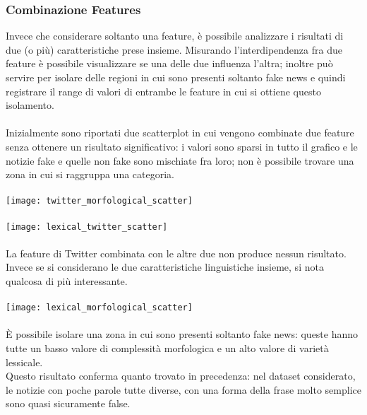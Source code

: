 \documentclass{article}
\begin{document}
\begin{multicols}{2}
				\subsubsection{Combinazione Features}
				Invece che considerare soltanto una feature, è possibile analizzare i risultati di due (o più) caratteristiche prese insieme. Misurando l'interdipendenza fra due feature è possibile visualizzare se una delle due influenza l'altra; inoltre può servire per isolare delle regioni in cui sono presenti soltanto fake news e quindi registrare il range di valori di entrambe le feature in cui si ottiene questo isolamento.\\~\\
				Inizialmente sono riportati due scatterplot in cui vengono combinate due feature senza ottenere un risultato significativo: i valori sono sparsi in tutto il grafico e le notizie fake e quelle non fake sono mischiate fra loro; non è possibile trovare una zona in cui si raggruppa una categoria.
				\\~\\						
				\texttt{[image: twitter\_morfological\_scatter]}
				\\~\\
				\texttt{[image: lexical\_twitter\_scatter]}
				\\~\\
				La feature di Twitter combinata con le altre due non produce nessun risultato.\\Invece se si considerano le due caratteristiche linguistiche insieme, si nota qualcosa di più interessante.
				\\~\\
				\texttt{[image: lexical\_morfological\_scatter]}
				\\~\\
				È possibile isolare una zona in cui sono presenti soltanto fake news: queste hanno tutte un basso valore di complessità morfologica e un alto valore di varietà lessicale.\\
				Questo risultato conferma quanto trovato in precedenza: nel dataset considerato, le notizie con poche parole tutte diverse, con una forma della frase molto semplice sono quasi sicuramente false.


\end{multicols}
\end{document}
